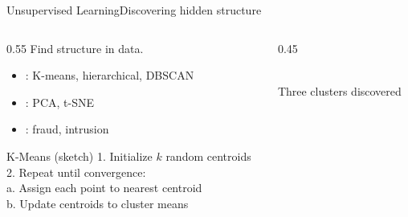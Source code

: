 \documentclass[aspectratio=169,11pt]{beamer}
\begin{document}
\begin{frame}{Unsupervised Learning}{Discovering hidden structure}
  \begin{columns}[T]
    \begin{column}{0.55\textwidth}
      Find structure in  data.
      \begin{itemize}\small
        \item {}: K-means, hierarchical, DBSCAN
        \item {}: PCA, t-SNE
        \item {}: fraud, intrusion
      \end{itemize}
      \vspace{0.3em}
      \begin{block}{K-Means (sketch)}
        \scriptsize
        1. Initialize $k$ random centroids \\
        2. Repeat until convergence: \\
        \quad a. Assign each point to nearest centroid \\
        \quad b. Update centroids to cluster means
      \end{block}
    \end{column}
    \begin{column}{0.45\textwidth}
      \begin{center}
      \\
      \scriptsize Three clusters discovered
      \end{center}
    \end{column}
  \end{columns}
\end{frame}
\end{document}
